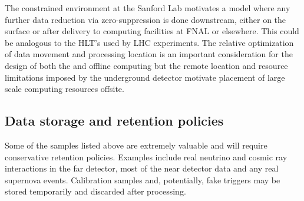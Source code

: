 The constrained environment at the Sanford Lab motivates a model where any further data reduction via zero-suppression is done downstream, either on the surface or after delivery to computing facilities at FNAL or elsewhere. This could be analogous to the HLT's used by LHC experiments. The relative optimization of data movement and processing location is an important consideration for the design of both the  and offline computing but the remote location and resource limitations imposed by the underground detector motivate placement of large scale computing resources offsite. 

\subsection{Data storage and retention policies}
Some of the samples listed above are extremely valuable and will require conservative retention policies.  Examples include real neutrino and cosmic ray interactions in the far detector, most of the near detector data and any real supernova events. Calibration samples and, potentially, fake  triggers may be stored temporarily and discarded after processing. 




